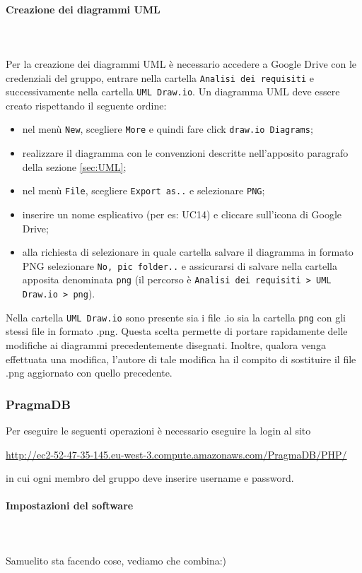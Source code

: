\paragraph{Creazione dei diagrammi UML} \mbox{}\\ \mbox{}\\
Per la creazione dei diagrammi UML\glo{} è necessario accedere a Google Drive 
con le credenziali del gruppo, entrare nella cartella \texttt{Analisi dei requisiti} e 
successivamente nella cartella \texttt{UML Draw.io}. Un diagramma UML deve essere creato
rispettando il seguente ordine:
	\begin{itemize}
		\item nel menù \texttt{New}, scegliere \texttt{More} e quindi fare
			click \texttt{draw.io Diagrams};
		\item realizzare il diagramma con le convenzioni descritte nell'apposito
			paragrafo della sezione \ref{sec:UML}; 
		\item nel menù \texttt{File}, scegliere \texttt{Export as..} e selezionare \texttt{PNG};
		\item inserire un nome esplicativo (per es: UC14) e cliccare sull'icona di
			Google Drive;
		\item alla richiesta di selezionare in quale cartella salvare il diagramma 
			in formato PNG selezionare \texttt{No, pic folder..} e assicurarsi di salvare 
			nella cartella apposita denominata \texttt{png} (il percorso è 
			\texttt{Analisi dei requisiti > UML Draw.io > png}).
	\end{itemize}
Nella cartella \texttt{UML Draw.io} sono presente sia i file .io sia la cartella \texttt{png}
con gli stessi file in formato .png. Questa scelta permette di portare rapidamente 
delle modifiche ai diagrammi precedentemente disegnati. Inoltre, qualora venga 
effettuata una modifica, l'autore di tale modifica ha il compito di sostituire
il file .png aggiornato con quello precedente. 

\subsubsection{PragmaDB} 
Per eseguire le seguenti operazioni è necessario eseguire la login al sito \\
\centerline{\url{http://ec2-52-47-35-145.eu-west-3.compute.amazonaws.com/PragmaDB/PHP/}}
in cui ogni membro del gruppo deve inserire username e password.
\paragraph{Impostazioni del software} \mbox{}\\ \mbox{}\\
Samuelito sta facendo cose, vediamo che combina:)

